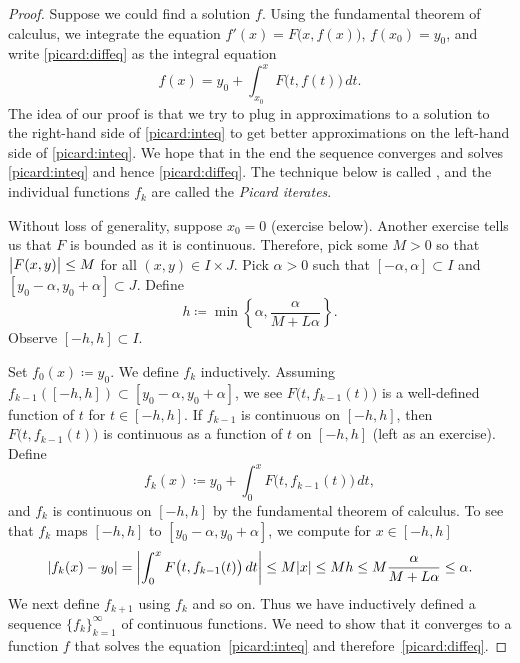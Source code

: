 \begin{proof}
\pagebreak[2]
Suppose we could find a solution $f$.  Using the fundamental
theorem of calculus, we integrate the equation 
$f'(x) = F\bigl(x,f(x)\bigr)$, $f(x_0) = y_0$, and write \eqref{picard:diffeq}
as the integral equation
\begin{equation} \label{picard:inteq}
f(x) = y_0 + \int_{x_0}^x F\bigl(t,f(t)\bigr)\,dt .
\end{equation}
The idea of our proof is that we try to plug in approximations to
a solution to the right-hand side of \eqref{picard:inteq} to get better approximations on the
left-hand side of  \eqref{picard:inteq}.  We hope that in the end the sequence 
converges and solves
\eqref{picard:inteq} and hence \eqref{picard:diffeq}.
The technique below is called \emph{},
and the individual functions $f_k$ are called the 
\emph{Picard iterates}.

Without loss of generality, suppose $x_0 = 0$ (exercise below).
Another
exercise tells us that $F$ is bounded as it is continuous.
Therefore, pick some $M > 0$ so that 
$\bigl\lvert {F(x,y)} \bigr\rvert \leq M$ for all $(x,y) \in I\times J$.
Pick $\alpha > 0$ such that
$[-\alpha,\alpha] \subset I$ and $[y_0-\alpha, y_0 + \alpha] \subset J$.
Define
\begin{equation*}
h \coloneqq \min \left\{ \alpha, \frac{\alpha}{M+L\alpha} \right\} .
\end{equation*}
Observe
$[-h,h] \subset I$.

Set $f_0(x) \coloneqq y_0$.
We define $f_k$ inductively.
Assuming $f_{k-1}([-h,h]) \subset [y_0-\alpha,y_0+\alpha]$,
we see 
$F\bigl(t,f_{k-1}(t)\bigr)$ is
a well-defined function of $t$ for $t \in [-h,h]$.
If $f_{k-1}$ is continuous
on $[-h,h]$, then
$F\bigl(t,f_{k-1}(t)\bigr)$ is
continuous as
a function of $t$ on $[-h,h]$ (left as an exercise).
Define
\begin{equation*}
f_k(x) \coloneqq y_0+ \int_{0}^x F\bigl(t,f_{k-1}(t)\bigr)\,dt ,
\end{equation*}
and $f_k$ is continuous on $[-h,h]$ by the fundamental theorem of calculus.
To see that $f_k$ maps $[-h,h]$ to $[y_0-\alpha,y_0+\alpha]$, we compute for
$x \in [-h,h]$
\begin{equation*}
\lvert {f_k(x) - y_0} \rvert = 
\left\lvert {\int_{0}^x F\bigl(t,f_{k-1}(t)\bigr)\,dt } \right\rvert
\leq
M\lvert {x} \rvert
\leq
Mh
\leq
M
\frac{\alpha}{M+L\alpha}
\leq \alpha .
\end{equation*}
We next define $f_{k+1}$ using $f_k$ and so on.
Thus we have inductively defined a sequence $\{ f_k \}_{k=1}^\infty$
of continuous functions.
We need to show that it converges to a function $f$ that solves
the equation~\eqref{picard:inteq} and therefore~\eqref{picard:diffeq}.


\end{proof}

